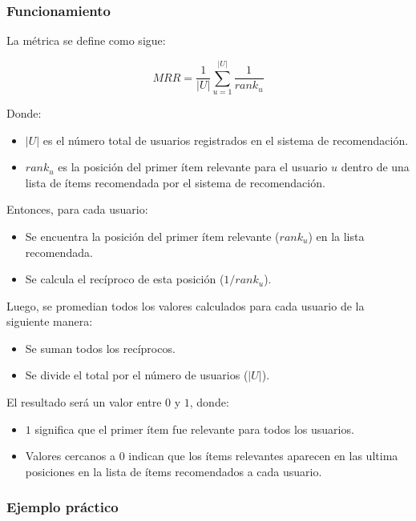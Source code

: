 \documentclass[11pt,a4paper,twoside]{thesis}
\begin{document}
\subsubsection{Funcionamiento}

La métrica se define como sigue:

\begin{equation}
	MRR= \frac{1}{|U|} \sum_{u=1}^{|U|} \frac{1}{rank_u}
\end{equation}

Donde:

\begin{itemize}
	\item $|U|$ es el número total de usuarios registrados en el sistema de recomendación.
	\item $rank_u$ es la posición del primer ítem relevante para el usuario $u$ dentro de una lista de ítems recomendada por el sistema de recomendación.
\end{itemize}

Entonces, para cada usuario:

\begin{itemize}
	\item Se encuentra la posición del primer ítem relevante ($rank_u$) en la lista recomendada.
	\item Se calcula el recíproco de esta posición ($1/rank_u$).
\end{itemize}

Luego, se promedian todos los valores calculados para cada usuario de la siguiente manera:
\begin{itemize}
	\item Se suman todos los recíprocos.
	\item Se divide el total por el número de usuarios ($|U|$).
\end{itemize}

El resultado será un valor entre $0$ y $1$, donde:
\begin{itemize}
	\item $1$ significa que el primer ítem fue relevante para todos los usuarios.
	\item Valores cercanos a $0$ indican que los ítems relevantes aparecen en las ultima posiciones en la lista de ítems recomendados a cada usuario.
\end{itemize}


\subsubsection{Ejemplo práctico}
\end{document}
